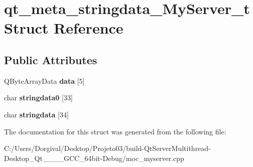 \section{qt\+\_\+meta\+\_\+stringdata\+\_\+\+My\+Server\+\_\+t Struct Reference}
\label{structqt__meta__stringdata___my_server__t}
\subsection*{Public Attributes}
\begin{DoxyCompactItemize}
\item 
\mbox{\label{structqt__meta__stringdata___my_server__t_a6b8c272a34c9891d4f50bddd2586257b}} 
Q\+Byte\+Array\+Data {\bfseries data} [5]
\item 
\mbox{\label{structqt__meta__stringdata___my_server__t_a7acc3222b181da2fe5755caf57bae2be}} 
char {\bfseries stringdata0} [33]
\item 
\mbox{\label{structqt__meta__stringdata___my_server__t_a78f31261b35445e3897ae8256d655007}} 
char {\bfseries stringdata} [34]
\end{DoxyCompactItemize}


The documentation for this struct was generated from the following file\+:\begin{DoxyCompactItemize}
\item 
C\+:/\+Users/\+Dorgival/\+Desktop/\+Projeto03/build-\/\+Qt\+Server\+Multithread-\/\+Desktop\+\_\+\+Qt\+\_\+\_\+\_\+\_\+\+G\+C\+C\+\_\+64bit-\/\+Debug/moc\+\_\+myserver.\+cpp\end{DoxyCompactItemize}
